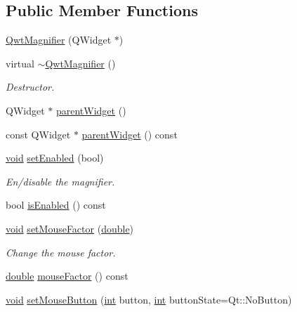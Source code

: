 \subsection*{Public Member Functions}
\begin{DoxyCompactItemize}
\item 
\hyperlink{class_qwt_magnifier_aa11b927c72e0421570a137f0fa1cfb7b}{Qwt\-Magnifier} (Q\-Widget $\ast$)
\item 
virtual \hyperlink{class_qwt_magnifier_ac18a7858407951a335399ee6969a50da}{$\sim$\-Qwt\-Magnifier} ()
\begin{DoxyCompactList}\small\item\em Destructor. \end{DoxyCompactList}\item 
Q\-Widget $\ast$ \hyperlink{class_qwt_magnifier_a56b7ad2366a7f908c38bc2a994acde16}{parent\-Widget} ()
\item 
const Q\-Widget $\ast$ \hyperlink{class_qwt_magnifier_a7ea89693ca6ebd6376838d4ab107bf5a}{parent\-Widget} () const 
\item 
\hyperlink{group___u_a_v_objects_plugin_ga444cf2ff3f0ecbe028adce838d373f5c}{void} \hyperlink{class_qwt_magnifier_a03d892c58039fc864a452b7c636a1df7}{set\-Enabled} (bool)
\begin{DoxyCompactList}\small\item\em En/disable the magnifier. \end{DoxyCompactList}\item 
bool \hyperlink{class_qwt_magnifier_a65552cac613ceac77e51b8deca522509}{is\-Enabled} () const 
\item 
\hyperlink{group___u_a_v_objects_plugin_ga444cf2ff3f0ecbe028adce838d373f5c}{void} \hyperlink{class_qwt_magnifier_ada5dac479dc1e69c04760bb7dc197ac9}{set\-Mouse\-Factor} (\hyperlink{_super_l_u_support_8h_a8956b2b9f49bf918deed98379d159ca7}{double})
\begin{DoxyCompactList}\small\item\em Change the mouse factor. \end{DoxyCompactList}\item 
\hyperlink{_super_l_u_support_8h_a8956b2b9f49bf918deed98379d159ca7}{double} \hyperlink{class_qwt_magnifier_a49348534d3cd7fe37a4a7cb6c3bbff8d}{mouse\-Factor} () const 
\item 
\hyperlink{group___u_a_v_objects_plugin_ga444cf2ff3f0ecbe028adce838d373f5c}{void} \hyperlink{class_qwt_magnifier_a345e4f61d48274f73f6e39fdcaea6745}{set\-Mouse\-Button} (\hyperlink{ioapi_8h_a787fa3cf048117ba7123753c1e74fcd6}{int} button, \hyperlink{ioapi_8h_a787fa3cf048117ba7123753c1e74fcd6}{int} button\-State=Qt\-::\-No\-Button)

\end{DoxyCompactItemize}
